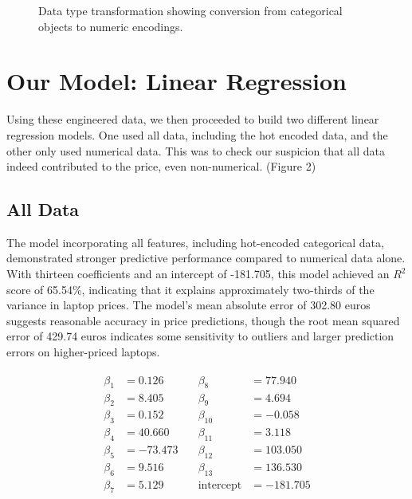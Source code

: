 \documentclass{article}
\begin{document}
\begin{figure}[!h]
    \caption{Data type transformation showing conversion from categorical objects to numeric encodings.}
    \label{fig:data-types}
\end{figure}

\section{Our Model: Linear Regression}
\label{gen_inst}

Using these engineered data, we then proceeded to build two different linear regression models. One used all data, including the hot encoded data, and the other only used numerical data. This was to check our suspicion that all data indeed contributed to the price, even non-numerical. (Figure 2)

\subsection{All Data}

The model incorporating all features, including hot-encoded categorical data, demonstrated stronger predictive performance compared to numerical data alone. With thirteen coefficients and an intercept of -181.705, this model achieved an $R^2$ score of 65.54\%, indicating that it explains approximately two-thirds of the variance in laptop prices. The model's mean absolute error of 302.80 euros suggests reasonable accuracy in price predictions, though the root mean squared error of 429.74 euros indicates some sensitivity to outliers and larger prediction errors on higher-priced laptops.

\begin{align*}
\begin{split}
\beta_1 &= 0.126 & \quad \beta_8 &= 77.940 \\
\beta_2 &= 8.405 & \quad \beta_9 &= 4.694 \\
\beta_3 &= 0.152 & \quad \beta_{10} &= -0.058 \\
\beta_4 &= 40.660 & \quad \beta_{11} &= 3.118 \\
\beta_5 &= -73.473 & \quad \beta_{12} &= 103.050 \\
\beta_6 &= 9.516 & \quad \beta_{13} &= 136.530 \\
\beta_7 &= 5.129 & \quad \text{intercept} &= -181.705
\end{split}
\end{align*}
\end{document}
